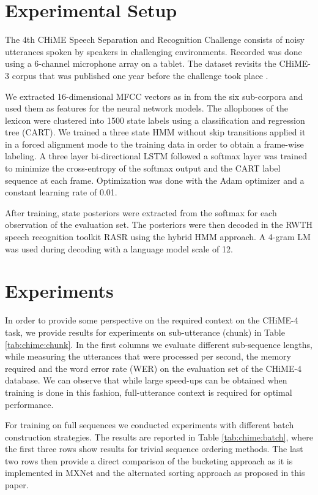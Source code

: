 \documentclass{article}
\begin{document}
  \section{Experimental Setup} \label{sec:setup}
  The 4th CHiME Speech Separation and Recognition Challenge
  \cite{Vincent_CSL2016:CHiME4} consists of noisy utterances spoken by speakers in challenging 
  environments. Recorded was done using a 6-channel microphone array on a tablet. The dataset revisits 
  the CHiME-3 corpus that was published one year before the challenge took place \cite{Barker2015:CHiME3}.
  
  We extracted 16-dimensional MFCC vectors as in \cite{menne16:chime4System} from the six sub-corpora
  and used them as features for the neural network models. The allophones of the lexicon were clustered into 
  1500 state labels using a classification and regression tree (CART).
  We trained a three state HMM without skip transitions applied it in a forced alignment mode to the training data in order to obtain a frame-wise labeling. A three layer 
  bi-directional LSTM followed a softmax layer was trained to minimize the cross-entropy of the softmax output and the CART label sequence at each frame. Optimization was done with the Adam optimizer and a constant learning rate of 0.01.
  
  After training, state posteriors were extracted from the softmax for each observation of the evaluation set. The posteriors were then decoded in the RWTH 
  speech recognition toolkit RASR \cite{rybach2011:rasr} using the hybrid HMM approach. A 4-gram LM 
  was used during decoding with a language model scale of 12.

  \section{Experiments} \label{sec:experiments}
   In order to provide some perspective on the required context on the CHiME-4 task, 
   we provide results for experiments on sub-utterance (chunk) in 
   Table \ref{tab:chime:chunk}. In the first columns we evaluate different sub-sequence lengths, while measuring the utterances that were processed per second, the memory required and the word error rate (WER) on the evaluation set of the CHiME-4 database. We can observe that 
   while large speed-ups can be obtained when training is done in this fashion, full-utterance context is
   required for optimal performance.
   
   For training on full sequences we conducted experiments with different batch construction strategies.
   The results are reported in Table \ref{tab:chime:batch}, where the first three rows show results for trivial sequence ordering 
   methods. The last two rows then provide a direct comparison of the bucketing approach as 
   it is implemented in MXNet and the alternated sorting approach as proposed in this paper.
    
\end{document}
